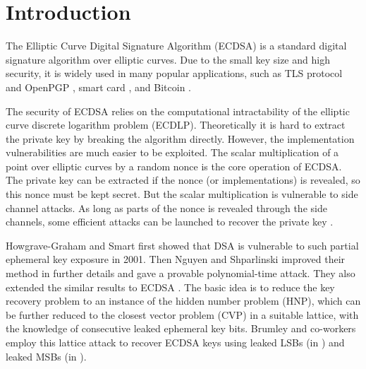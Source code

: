 
\section{Introduction}
\label{sec:intro}
The Elliptic Curve Digital Signature Algorithm (ECDSA) \cite{Johnson2001, ansi2005} is a standard digital signature algorithm over elliptic curves.
Due to the small key size and high security, it is widely used in many popular applications, such as TLS protocol \cite{rfc5246} and OpenPGP \cite{openpgp2007}, smart card \cite{smartcard2007}, and Bitcoin \cite{bitcoin2008}.

The security of ECDSA relies on the computational intractability of the elliptic curve discrete logarithm problem (ECDLP).
Theoretically it is hard to extract the private key by breaking the algorithm directly.
However, the implementation vulnerabilities are much easier to be exploited.
The scalar multiplication of a point over elliptic curves by a random nonce is the core operation of ECDSA.
The private key can be extracted if the nonce (or implementations) is revealed,
so this nonce must be kept secret.
But the scalar multiplication is vulnerable to side channel attacks.
As long as parts of the nonce is revealed through the side channels,
 some efficient attacks can be launched to recover the private key \cite{Nguyen2001,HG2001,Nguyen2002,Nguyen2003}.

Howgrave-Graham and Smart \cite{HG2001} first showed that DSA is vulnerable to such partial ephemeral key exposure in 2001.
Then Nguyen and Shparlinski \cite{Nguyen2002} improved their method in further details and gave a provable polynomial-time attack.
They also extended the similar results to ECDSA \cite{Nguyen2003}.
The basic idea is to reduce the key recovery problem to an instance of the hidden number problem
(HNP), which can be further reduced to the closest vector problem (CVP) in a suitable lattice, with the
knowledge of consecutive leaked ephemeral key bits.
Brumley and co-workers employ this lattice attack to recover ECDSA keys using leaked LSBs (in \cite{Brumley2009}) and leaked MSBs (in \cite{Brumley2011}).




